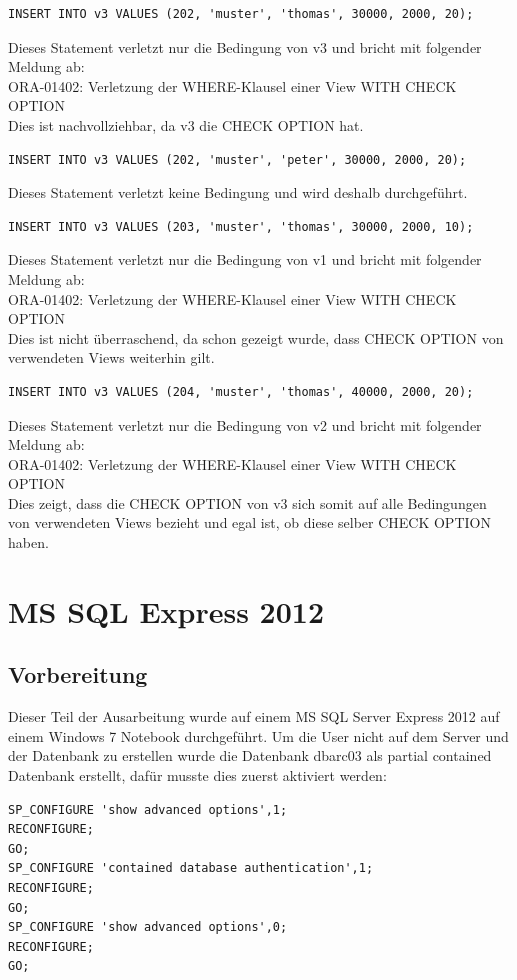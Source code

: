 \documentclass[10pt]{scrreprt}
\begin{document}
\begin{lstlisting}[style=sql]
INSERT INTO v3 VALUES (202, 'muster', 'thomas', 30000, 2000, 20);
\end{lstlisting}
Dieses Statement verletzt nur die Bedingung von v3 und bricht mit folgender Meldung ab:\\
ORA-01402: Verletzung der WHERE-Klausel einer View WITH CHECK OPTION\\
Dies ist nachvollziehbar, da v3 die CHECK OPTION hat.

\begin{lstlisting}[style=sql]
INSERT INTO v3 VALUES (202, 'muster', 'peter', 30000, 2000, 20);
\end{lstlisting}
Dieses Statement verletzt keine Bedingung und wird deshalb durchgeführt.

\begin{lstlisting}[style=sql]
INSERT INTO v3 VALUES (203, 'muster', 'thomas', 30000, 2000, 10);
\end{lstlisting}
Dieses Statement verletzt nur die Bedingung von v1 und bricht mit folgender Meldung ab:\\
ORA-01402: Verletzung der WHERE-Klausel einer View WITH CHECK OPTION\\
Dies ist nicht überraschend, da schon gezeigt wurde, dass CHECK OPTION von verwendeten Views weiterhin gilt.

\begin{lstlisting}[style=sql]
INSERT INTO v3 VALUES (204, 'muster', 'thomas', 40000, 2000, 20);
\end{lstlisting}
Dieses Statement verletzt nur die Bedingung von v2 und bricht mit folgender Meldung ab:\\
ORA-01402: Verletzung der WHERE-Klausel einer View WITH CHECK OPTION\\
Dies zeigt, dass die CHECK OPTION von v3 sich somit auf alle Bedingungen von verwendeten Views bezieht und egal ist, ob diese selber CHECK OPTION haben.
\chapter{MS SQL Express 2012}
\section{Vorbereitung}
Dieser Teil der Ausarbeitung wurde auf einem MS SQL Server Express 2012 auf einem Windows 7 Notebook durchgeführt. Um die User nicht auf dem Server und der Datenbank zu erstellen wurde die Datenbank dbarc03 als partial contained Datenbank erstellt, dafür musste dies zuerst aktiviert werden:
\begin{lstlisting}[style=sql]
SP_CONFIGURE 'show advanced options',1;
RECONFIGURE;
GO;
SP_CONFIGURE 'contained database authentication',1;
RECONFIGURE;
GO;
SP_CONFIGURE 'show advanced options',0;
RECONFIGURE;
GO;
\end{lstlisting}
\end{document}
